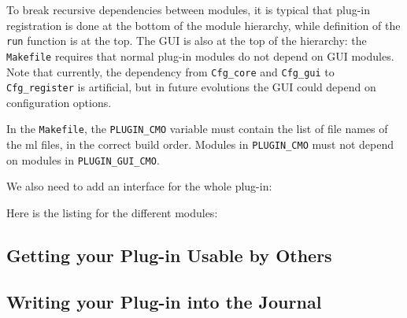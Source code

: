 To break recursive dependencies between \ocaml modules, it is typical
that plug-in registration is done at the bottom of the module
hierarchy, while definition of the \texttt{run} function is at the
top. The GUI is also at the top of the hierarchy: the \framac
\texttt{Makefile} requires that normal plug-in modules do not depend on
GUI modules. Note that currently, the dependency from
\texttt{Cfg\_core} and \texttt{Cfg\_gui} to \texttt{Cfg\_register} is
artificial, but in future evolutions the GUI could depend on
configuration options.


In the \texttt{Makefile}, the \texttt{PLUGIN\_CMO} variable must
contain the list of file names of the ml files, in the correct \ocaml
build order. Modules in \texttt{PLUGIN\_CMO} must not depend on modules in
\texttt{PLUGIN\_GUI\_CMO}.

We also need to add an interface for the whole plug-in:

Here is the listing for the different modules:





\subsection{Getting your Plug-in Usable by Others}\label{tut2:api}
\todo


\subsection{Writing your Plug-in into the Journal}\label{tut2:journal}
\todo

